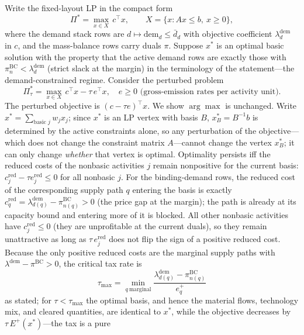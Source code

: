 Write the fixed-layout LP in the compact form
\begin{equation}
\Pi^{*}=\max_{x\in X}\,c^{\top}x,\qquad
X=\{x: Ax\le b,\ x\ge 0\},
\end{equation}
where the demand stack rows are $d\mapsto \mathrm{dem}_d\le \bar{d}_d$ with
objective coefficient $\lambda^{\mathrm{dem}}_d$ in $c$, and the mass-balance
rows carry duals $\pi$. Suppose $x^{*}$ is an optimal basic solution with the
property that the active demand rows are exactly those with
$\pi^{\mathrm{BC}}_{n}<\lambda^{\mathrm{dem}}_{d}$ (strict slack at the margin)
in the terminology of the statement---the demand-constrained regime. Consider
the perturbed problem
\begin{equation}
\Pi^{*}_{\tau}=\max_{x\in X}\,c^{\top}x-\tau\,e^{\top}x,
\quad e\ge 0 \text{ (gross-emission rates per activity unit)}.
\end{equation}
The perturbed objective is $(c-\tau e)^{\top}x$. We show
$\arg\max$ is unchanged. Write $x^{*}=\sum_{\text{basic } j} w_j x_j$; since
$x^{*}$ is an LP vertex with basis $B$, $x_B^{*}=B^{-1}b$ is determined by the
active constraints alone, so any perturbation of the objective---which does not
change the constraint matrix $A$---cannot change the vertex $x_B^{*}$; it can
only change \emph{whether} that vertex is optimal. Optimality persists iff the
reduced costs of the nonbasic activities $j$ remain nonpositive for the
current basis: $c^{\mathrm{red}}_j-\tau e^{\mathrm{red}}_j\le 0$ for all
nonbasic $j$. For the binding-demand rows, the reduced cost of the
corresponding supply path $q$ entering the basis is exactly
$c^{\mathrm{red}}_q=\lambda^{\mathrm{dem}}_{d(q)}-\pi^{\mathrm{BC}}_{n(q)}>0$
(the price gap at the margin); the path is already at its capacity bound and
entering more of it is blocked. All other nonbasic activities have
$c^{\mathrm{red}}_j\le 0$ (they are unprofitable at the current duals), so
they remain unattractive as long as
$\tau\,e^{\mathrm{red}}_j$ does not flip the sign of a positive reduced cost.
Because the only positive reduced costs are the marginal supply paths with
$\lambda^{\mathrm{dem}}-\pi^{\mathrm{BC}}>0$, the critical tax rate is
\begin{equation}
\tau_{\max}=\min_{q\ \text{marginal}}\frac{\lambda^{\mathrm{dem}}_{d(q)}-\pi^{\mathrm{BC}}_{n(q)}}{e^{+}_q}
\end{equation}
as stated; for $\tau<\tau_{\max}$ the optimal basis, and hence the material
flows, technology mix, and cleared quantities, are identical to $x^{*}$, while
the objective decreases by $\tau\,E^{+}(x^{*})$---the tax is a pure
